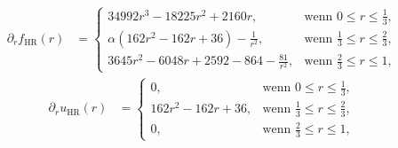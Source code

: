 \begin{align*}
  \partial_r f_\textrm{HR}(r) &=
  \begin{cases}
    34992r^3 - 18225r^2 + 2160r, & \text{wenn } 0\leq r\leq\frac{1}{3},\\
    \alpha\left(162r^2 - 162r + 36\right) - \frac{1}{r^2}, & 
    \text{wenn } \frac{1}{3}\leq r\leq \frac{2}{3},\\
    3645r^2 - 6048r + 2592 - 864 - \frac{81}{r^2}, & 
    \text{wenn } \frac{2}{3}\leq r\leq 1,
  \end{cases}
\end{align*}
\begin{align*}
  \partial_r u_\textrm{HR}(r) &=
  \begin{cases}
    0, & \text{wenn } 0\leq r\leq\frac{1}{3},\\
    162r^2 - 162r + 36, & 
    \text{wenn } \frac{1}{3}\leq r\leq \frac{2}{3},\\
    0, & \text{wenn } \frac{2}{3}\leq r\leq 1,
  \end{cases}
\end{align*}

